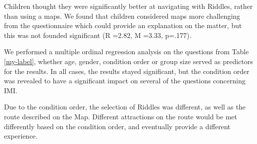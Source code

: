 Children thought they were significantly better at navigating with Riddles, rather than using a maps. We found that children considered maps more challenging from the questionnaire which could provide an explanation on the matter, but this was not founded significant (R =2.82, M =3.33, p=.177).
 
We performed a multiple ordinal regression analysis on the questions from Table \ref{my-label}, whether age, gender, condition order or group size served as predictors for the results. In all cases, the results stayed significant, but the condition order was revealed to have a significant impact on several of the questions concerning IMI. 

Due to the condition order, the selection of Riddles was different, as well as the route described on the Map. Different attractions on the route would be met differently based on the condition order, and eventually provide a different experience. 

